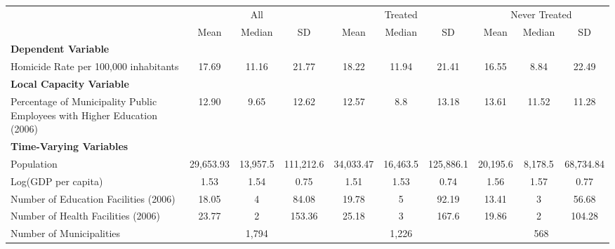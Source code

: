 \documentclass{article}
\begin{document}
\begin{table}[!htbp]
\centering
\begin{adjustbox}{max width=\textwidth}
\begin{tabular}{lccccccccc}
\toprule
& \multicolumn{3}{c}{All} & \multicolumn{3}{c}{Treated} & \multicolumn{3}{c}{Never Treated} \\
\cmidrule(lr){2-4} \cmidrule(lr){5-7} \cmidrule(lr){8-10}
& Mean & Median & SD & Mean & Median & SD & Mean & Median & SD \\
\midrule
\multicolumn{10}{l}{\textbf{Dependent Variable}} \\
Homicide Rate per 100,000 inhabitants & 17.69 & 11.16 & 21.77 & 18.22 & 11.94 & 21.41 & 16.55 & 8.84 & 22.49 \\[0.5em]
\midrule
\multicolumn{10}{l}{\textbf{Local Capacity Variable}} \\
Percentage of Municipality Public Employees with Higher Education (2006) & 12.90 & 9.65 & 12.62 & 12.57 & 8.8 & 13.18 & 13.61 & 11.52 & 11.28 \\[0.5em]
\midrule
\multicolumn{10}{l}{\textbf{Time-Varying Variables}} \\
Population & 29,653.93 & 13,957.5 & 111,212.6 & 34,033.47 & 16,463.5 & 125,886.1 & 20,195.6 & 8,178.5 & 68,734.84 \\
Log(GDP per capita) & 1.53 & 1.54 & 0.75 & 1.51 & 1.53 & 0.74 & 1.56 & 1.57 & 0.77 \\
Number of Education Facilities (2006) & 18.05 & 4 & 84.08 & 19.78 & 5 & 92.19 & 13.41 & 3 & 56.68 \\
Number of Health Facilities (2006) & 23.77 & 2 & 153.36 & 25.18 & 3 & 167.6 & 19.86 & 2 & 104.28 \\
\midrule
Number of Municipalities & \multicolumn{3}{c}{1,794} & \multicolumn{3}{c}{1,226} & \multicolumn{3}{c}{568} \\
\bottomrule
\end{tabular}
\end{adjustbox}
\end{table}
\end{document}
